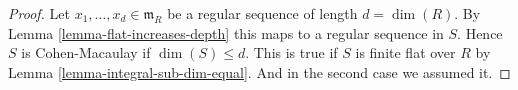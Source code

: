 \begin{proof}
Let $x_1, \ldots, x_d \in \mathfrak m_R$ be a regular sequence
of length $d = \dim(R)$. By Lemma \ref{lemma-flat-increases-depth}
this maps to a regular sequence in $S$.
Hence $S$ is Cohen-Macaulay if $\dim(S) \leq d$. This is true
if $S$ is finite flat over $R$ by Lemma \ref{lemma-integral-sub-dim-equal}.
And in the second case we assumed it.
\end{proof}









